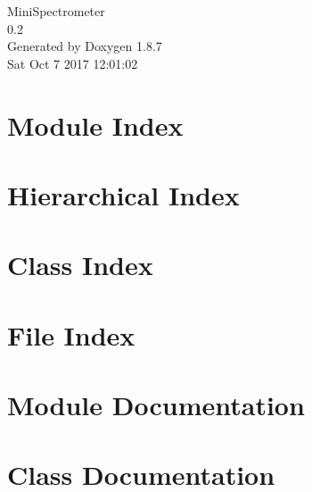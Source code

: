 \documentclass[twoside]{book}
\newcommand{\+}{\discretionary{\mbox{\scriptsize$\hookleftarrow$}}{}{}}
\newcommand{\clearemptydoublepage}{%
  \newpage{\pagestyle{empty}\cleardoublepage}%
}
\begin{document}
\hypersetup{pageanchor=false,
             bookmarks=true,
             bookmarksnumbered=true,
             pdfencoding=unicode
            }
\begin{titlepage}
\vspace*{7cm}
\begin{center}%
{\Large Mini\+Spectrometer \\[1ex]\large 0.\+2 }\\
\vspace*{1cm}
{\large Generated by Doxygen 1.8.7}\\
\vspace*{0.5cm}
{\small Sat Oct 7 2017 12:01:02}\\
\end{center}
\end{titlepage}
\clearemptydoublepage
\tableofcontents
\clearemptydoublepage
{}
\hypersetup{pageanchor=true}

\chapter{Module Index}

\chapter{Hierarchical Index}

\chapter{Class Index}

\chapter{File Index}

\chapter{Module Documentation}



\chapter{Class Documentation}








\end{document}
